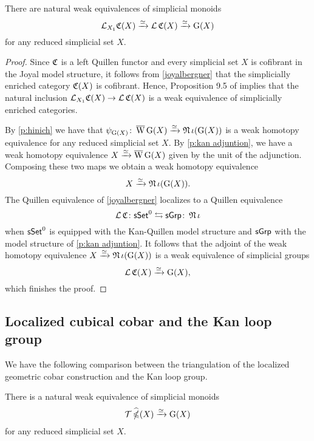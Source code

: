 \begin{lemma} \label{CandG}
	There are natural weak equivalences of simplicial monoids
	\[
	\operatorname{\mathcal{L}}_{X_1} \! \operatorname{\mathfrak{C}}(X) \xrightarrow{\simeq} \operatorname{\mathcal{L}} \operatorname{\mathfrak{C}}(X) \xrightarrow{\simeq} \operatorname{G}(X)
	\]
	for any reduced simplicial set $X$.
\end{lemma}

\begin{proof}
	Since $\operatorname{\mathfrak{C}}$ is a left Quillen functor and every simplicial set $X$ is cofibrant in the Joyal model structure, it follows from \cref{joyalbergner} that the simplicially enriched category $\operatorname{\mathfrak{C}}(X)$ is cofibrant.
	Hence, Proposition 9.5 of \cite{dwyer1980simplicial} implies that the natural inclusion $\operatorname{\mathcal{L}}_{X_1} \! \operatorname{\mathfrak{C}}(X) \to \operatorname{\mathcal{L}} \operatorname{\mathfrak{C}}(X)$ is a weak equivalence of simplicially enriched categories.

	By \cref{p:hinich} we have that $\psi_{\operatorname{G}(X)} \colon \operatorname{\overline{W}} \operatorname{G}(X) \xrightarrow{\simeq} \operatorname{\mathfrak{N}} \iota(\operatorname{G}(X))$ is a weak homotopy equivalence for any reduced simplicial set $X$.
	By \cref{p:kan adjuntion}, we have a weak homotopy equivalence $X \xrightarrow{\simeq} \operatorname{\overline{W}} \operatorname{G}(X)$ given by the unit of the adjunction.
	Composing these two maps we obtain a weak homotopy equivalence
	\[
	X \xrightarrow{\simeq} \operatorname{\mathfrak{N}}\iota(\operatorname{G}(X)).
	\]
	The Quillen equivalence of \cref{joyalbergner} localizes to a Quillen equivalence
	\[
	\operatorname{\mathcal{L}} \operatorname{\mathfrak{C}} \colon \mathsf{sSet}^0 \leftrightarrows \mathsf{sGrp} \colon \operatorname{\mathfrak{N}} \iota
	\]
	when $\mathsf{sSet}^0$ is equipped with the Kan-Quillen model structure and $\mathsf{sGrp}$ with the model structure of \cref{p:kan adjuntion}.
	It follows that the adjoint of the weak homotopy equivalence $X \xrightarrow{\simeq} \operatorname{\mathfrak{N}} \iota(\operatorname{G}(X))$ is a weak equivalence of simplicial groups
	\[
	\operatorname{\mathcal{L}} \operatorname{\mathfrak{C}}(X) \xrightarrow{\simeq} \operatorname{G}(X),
	\]
	which finishes the proof.
\end{proof}


\subsection{Localized cubical cobar and the Kan loop group}

We have the following comparison between the triangulation of the localized geometric cobar construction and the Kan loop group.

\begin{corollary} \label{widehatgcobarandG}
	There is a natural weak equivalence of simplicial monoids
	\[
	\operatorname{\mathcal{T}} \operatorname{\widehat{\mathbb{\Omega}}}(X) \xrightarrow{\simeq} \operatorname{G}(X)
	\]
	for any reduced simplicial set $X$.
\end{corollary}

